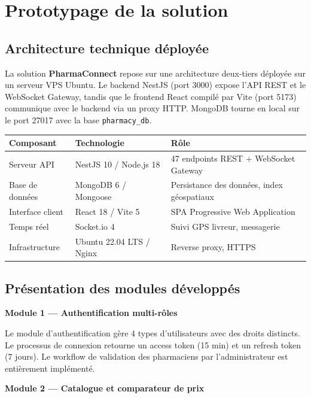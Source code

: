 \documentclass[12pt,a4paper,oneside]{report}
\newcommand{\pharma}{\textcolor{vertpharma}{\textbf{PharmaConnect}}}
\begin{document}
\section{Prototypage de la solution}

\subsection{Architecture technique déployée}

La solution \pharma{} repose sur une architecture deux-tiers déployée sur un serveur VPS Ubuntu. Le backend NestJS (port 3000) expose l'API REST et le WebSocket Gateway, tandis que le frontend React compilé par Vite (port 5173) communique avec le backend via un proxy HTTP. MongoDB tourne en local sur le port 27017 avec la base \texttt{pharmacy\_db}.

\begin{center}
\begin{tabular}{lll}
  \toprule
  \textbf{Composant} & \textbf{Technologie} & \textbf{Rôle} \\
  \midrule
  Serveur API & NestJS 10 / Node.js 18 & 47 endpoints REST + WebSocket Gateway \\
  Base de données & MongoDB 6 / Mongoose & Persistance des données, index géospatiaux \\
  Interface client & React 18 / Vite 5 & SPA Progressive Web Application \\
  Temps réel & Socket.io 4 & Suivi GPS livreur, messagerie \\
  Infrastructure & Ubuntu 22.04 LTS / Nginx & Reverse proxy, HTTPS \\
  \bottomrule
\end{tabular}
\end{center}

\subsection{Présentation des modules développés}

\textbf{Module 1 — Authentification multi-rôles}

Le module d'authentification gère 4 types d'utilisateurs avec des droits distincts. Le processus de connexion retourne un access token (15 min) et un refresh token (7 jours). Le workflow de validation des pharmaciens par l'administrateur est entièrement implémenté.

\textbf{Module 2 — Catalogue et comparateur de prix}
\end{document}
